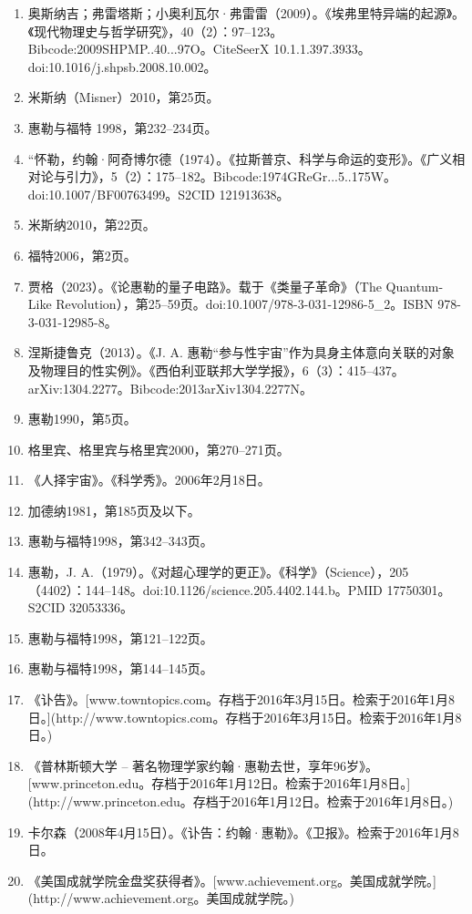 \begin{enumerate}
\item 奥斯纳吉；弗雷塔斯；小奥利瓦尔·弗雷雷（2009）。《埃弗里特异端的起源》。《现代物理史与哲学研究》，40（2）：97–123。Bibcode:2009SHPMP..40...97O。CiteSeerX 10.1.1.397.3933。doi:10.1016/j.shpsb.2008.10.002。
\item 米斯纳（Misner）2010，第25页。
\item 惠勒与福特 1998，第232–234页。
\item “怀勒，约翰·阿奇博尔德（1974）。《拉斯普京、科学与命运的变形》。《广义相对论与引力》，5（2）：175–182。Bibcode:1974GReGr...5..175W。doi:10.1007/BF00763499。S2CID 121913638。
\item 米斯纳2010，第22页。
\item 福特2006，第2页。
\item 贾格（2023）。《论惠勒的量子电路》。载于《类量子革命》（The Quantum-Like Revolution），第25–59页。doi:10.1007/978-3-031-12986-5\_2。ISBN 978-3-031-12985-8。
\item 涅斯捷鲁克（2013）。《J. A. 惠勒“参与性宇宙”作为具身主体意向关联的对象及物理目的性实例》。《西伯利亚联邦大学学报》，6（3）：415–437。arXiv:1304.2277。Bibcode:2013arXiv1304.2277N。
\item 惠勒1990，第5页。
\item 格里宾、格里宾与格里宾2000，第270–271页。
\item 《人择宇宙》。《科学秀》。2006年2月18日。
\item 加德纳1981，第185页及以下。
\item 惠勒与福特1998，第342–343页。
\item 惠勒，J. A.（1979）。《对超心理学的更正》。《科学》（Science），205（4402）：144–148。doi:10.1126/science.205.4402.144.b。PMID 17750301。S2CID 32053336。
\item 惠勒与福特1998，第121–122页。
\item 惠勒与福特1998，第144–145页。
\item 《讣告》。[www.towntopics.com。存档于2016年3月15日。检索于2016年1月8日。](http://www.towntopics.com。存档于2016年3月15日。检索于2016年1月8日。)
\item 《普林斯顿大学 – 著名物理学家约翰·惠勒去世，享年96岁》。[www.princeton.edu。存档于2016年1月12日。检索于2016年1月8日。](http://www.princeton.edu。存档于2016年1月12日。检索于2016年1月8日。)
\item 卡尔森（2008年4月15日）。《讣告：约翰·惠勒》。《卫报》。检索于2016年1月8日。
\item 《美国成就学院金盘奖获得者》。[www.achievement.org。美国成就学院。](http://www.achievement.org。美国成就学院。)
\end{enumerate}
